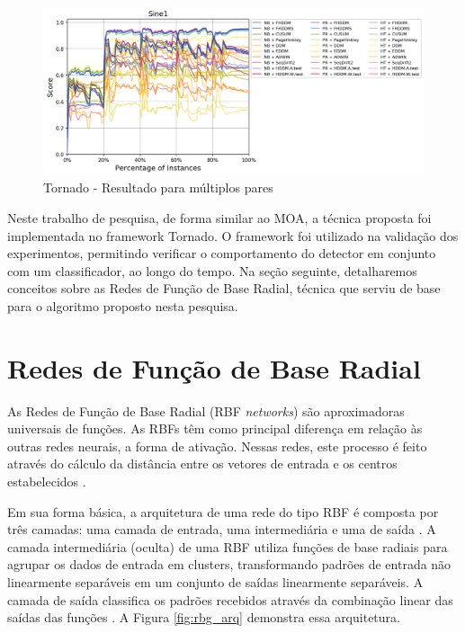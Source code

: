 \documentclass[qual, classic, a4paper]{ufbathesis}
\begin{document}
\begin{figure}[!ht]
\begin{center}
    \includegraphics[scale=0.5]{imagens/tornado_out2.png}
    \caption{Tornado - Resultado para múltiplos pares \cite{Pesaranghader:Tornado}}
    \label{fig:tornado_out2}
\end{center}
\end{figure}

Neste trabalho de pesquisa, de forma similar ao MOA, a técnica proposta foi implementada no framework Tornado.
O framework foi utilizado na validação dos experimentos, permitindo verificar o comportamento do detector em conjunto com um classificador, ao longo do tempo.
Na seção seguinte, detalharemos conceitos sobre as Redes de Função de Base Radial, técnica que serviu de base para o algoritmo proposto nesta pesquisa.

\section{Redes de Função de Base Radial}

As Redes de Função de Base Radial (RBF \textit{networks}) são aproximadoras universais de funções.
As RBFs têm como principal diferença em relação às outras redes neurais, a forma de ativação.
Nessas redes, este processo é feito através do cálculo da distância entre os vetores de entrada e os centros estabelecidos \cite{Braga:RedesNeuraisTeoriaAplicacoes}.

Em sua forma básica, a arquitetura de uma rede do tipo RBF é composta por três camadas: 
uma camada de entrada, uma intermediária e uma de saída \cite{Rojas:1996:NNS:235222}. 
A camada intermediária (oculta) de uma RBF utiliza funções de base radiais para agrupar os dados de entrada em clusters, 
transformando padrões de entrada não linearmente separáveis em um conjunto de saídas linearmente separáveis. 
A camada de saída classifica os padrões recebidos através da combinação linear das saídas das funções \cite{Braga:RedesNeuraisTeoriaAplicacoes}.
A Figura \ref{fig:rbg_arq} demonstra essa arquitetura.
\end{document}
